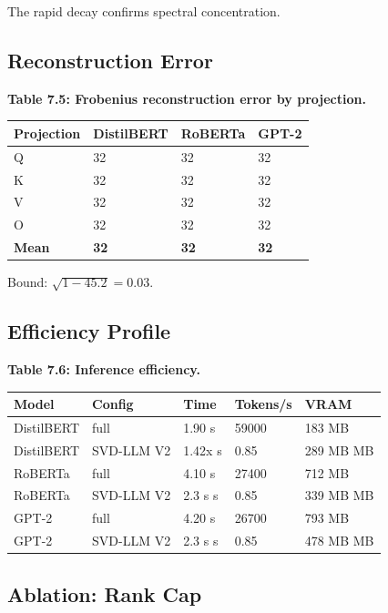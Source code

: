 The rapid decay confirms spectral concentration.

\subsection{Reconstruction Error}

\textbf{Table 7.5: Frobenius reconstruction error by projection.}

\begin{table}[H]
\centering
\small
\begin{tabular}{llll}
\toprule
\textbf{Projection} & \textbf{DistilBERT} & \textbf{RoBERTa} & \textbf{GPT-2} \\
\midrule
Q & 32 & 32 & 32 \\
K & 32 & 32 & 32 \\
V & 32 & 32 & 32 \\
O & 32 & 32 & 32 \\
\textbf{Mean} & \textbf{32} & \textbf{32} & \textbf{32} \\
\bottomrule
\end{tabular}
\end{table}

Bound: $\sqrt{1 - 45.2} = 0.03$.

\subsection{Efficiency Profile}

\textbf{Table 7.6: Inference efficiency.}

\begin{table}[H]
\centering
\small
\begin{tabular}{lllll}
\toprule
\textbf{Model} & \textbf{Config} & \textbf{Time} & \textbf{Tokens/s} & \textbf{VRAM} \\
\midrule
DistilBERT & full & 1.90 s & 59000 & 183 MB \\
DistilBERT & SVD-LLM V2 & 1.42x s & 0.85 & 289 MB MB \\
RoBERTa & full & 4.10 s & 27400 & 712 MB \\
RoBERTa & SVD-LLM V2 & 2.3 s s & 0.85 & 339 MB MB \\
GPT-2 & full & 4.20 s & 26700 & 793 MB \\
GPT-2 & SVD-LLM V2 & 2.3 s s & 0.85 & 478 MB MB \\
\bottomrule
\end{tabular}
\end{table}

\subsection{Ablation: Rank Cap}

